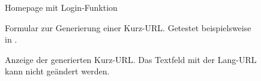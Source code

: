 \documentclass[parskip=full,11pt,twoside]{scrartcl}
\begin{document}

\begin{figure}[hb]
\caption{\label{fig:homepage}
Homepage mit Login-Funktion
}
\end{figure}

\begin{figure}[hb]
\caption{\label{fig:form}
Formular zur Generierung einer Kurz-URL.
Getestet beispielsweise in .
}
\end{figure}

\begin{figure}[hb]
\caption{\label{fig:generated}
Anzeige der generierten Kurz-URL.
Das Textfeld mit der Lang-URL kann nicht geändert werden.
}
\end{figure}
\end{document}
